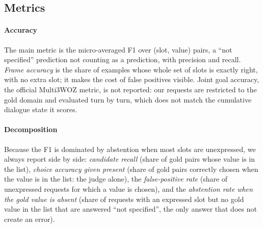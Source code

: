 \begin{table}[pos=t]
\centering
\small
\caption{Judges. Revisions are Hugging Face commit hashes (abbreviated); all are recorded in \texttt{MODELES.lock.json}.}
\label{tab:llms}
\end{table}

\subsection{Metrics}
\label{sec:metrics}

\paragraph{Accuracy} The main metric is the micro-averaged F1 over (slot, value) pairs, a ``not specified'' prediction not counting as a prediction, with precision and recall. \emph{Frame accuracy} is the share of examples whose whole set of slots is exactly right, with no extra slot; it makes the cost of false positives visible. Joint goal accuracy, the official Multi3WOZ metric, is not reported: our requests are restricted to the gold domain and evaluated turn by turn, which does not match the cumulative dialogue state it scores.

\paragraph{Decomposition} Because the F1 is dominated by abstention when most slots are unexpressed, we always report side by side: \emph{candidate recall} (share of gold pairs whose value is in the list), \emph{choice accuracy given present} (share of gold pairs correctly chosen when the value is in the list: the judge alone), the \emph{false-positive rate} (share of unexpressed requests for which a value is chosen), and the \emph{abstention rate when the gold value is absent} (share of requests with an expressed slot but no gold value in the list that are answered ``not specified'', the only answer that does not create an error).

